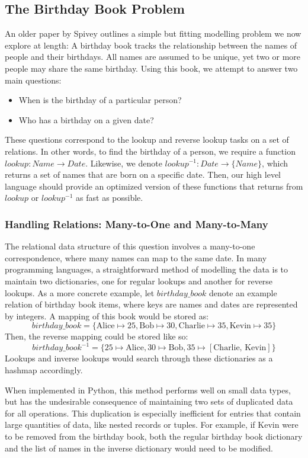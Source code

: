 \documentclass{article}
\begin{document}
\subsection{The Birthday Book Problem}

An older paper by Spivey \cite{spivey1989birthday} outlines a simple but fitting modelling problem we now explore at length: A birthday book tracks the relationship between the names of people and their birthdays. All names are assumed to be unique, yet two or more people may share the same birthday. Using this book, we attempt to answer two main questions:
\begin{itemize}
  \item When is the birthday of a particular person?
  \item Who has a birthday on a given date?
\end{itemize}
These questions correspond to the lookup and reverse lookup tasks on a set of relations. In other words, to find the birthday of a person, we require a function $lookup: Name \rightarrow Date$. Likewise, we denote $lookup^{-1}: Date \rightarrow \{Name\}$, which returns a set of names that are born on a specific date. Then, our high level language should provide an optimized version of these functions that returns from $lookup$ or $lookup^{-1}$ as fast as possible.

\subsubsection{Handling Relations: Many-to-One and Many-to-Many}

The relational data structure of this question involves a many-to-one correspondence, where many names can map to the same date. In many programming languages, a straightforward method of modelling the data is to maintain two dictionaries, one for regular lookups and another for reverse lookups. As a more concrete example, let $birthday\_book$ denote an example relation of birthday book items, where keys are names and dates are represented by integers. A mapping of this book would be stored as:
\[birthday\_book = \{\text{Alice} \mapsto 25, \text{Bob} \mapsto 30, \text{Charlie} \mapsto 35, \text{Kevin} \mapsto 35 \}\]
Then, the reverse mapping could be stored like so:
\[birthday\_book^{-1} = \{25 \mapsto \text{Alice}, 30 \mapsto \text{Bob}, 35 \mapsto [\text{Charlie, Kevin}] \}\]
Lookups and inverse lookups would search through these dictionaries as a hashmap accordingly.

When implemented in Python, this method performs well on small data types, but has the undesirable consequence of maintaining two sets of duplicated data for all operations. This duplication is especially inefficient for entries that contain large quantities of data, like nested records or tuples. For example, if Kevin were to be removed from the birthday book, both the regular birthday book dictionary and the list of names in the inverse dictionary would need to be modified.
\end{document}
